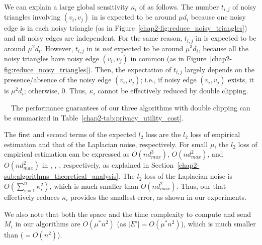 We can explain a large global sensitivity $\kappa_i$ of \AlgThree{} as follows. 
The number $t_{i,j}$ of noisy triangles involving $(v_i,v_j)$ in 
\AlgOne{} is expected to be around $\mu d_i$ because one noisy edge is in each noisy triangle (as in Figure~\ref{chap2-fig:reduce_noisy_triangles}) and all noisy edges are independent. 
For the same reason, $t_{i,j}$ in \AlgTwo{} is expected to be around $\mu^2 d_i$.  
% 
However, 
$t_{i,j}$ in \AlgThree{} is \textit{not} expected to be around $\mu^3 d_i$, because all the noisy triangles have noisy edge $(v_i,v_j)$ in common (as in Figure~\ref{chap2-fig:reduce_noisy_triangles}). 
Then, 
the expectation of $t_{i,j}$ 
largely depends on the presence/absence of the noisy edge $(v_i,v_j)$; i.e., if noisy edge $(v_i,v_j)$ exists, 
it is $\mu^2 d_i$; otherwise, $0$. 
Thus, 
$\kappa_i$ 
cannot be effectively reduced by double clipping. 

\smallskip
{}~~The 
performance guarantees 
of our three algorithms with double clipping can be summarized in Table~\ref{chap2-tab:privacy_utility_cost}.

The first and second terms of the expected 
$l_2$ loss are the $l_2$ loss of empirical estimation and that of the Laplacian noise, respectively. 
For small 
$\mu$, 
the $l_2$ loss of empirical estimation can be expressed as $O(n d_{max}^3)$, $O(n d_{max}^2)$, and $O(n d_{max}^2)$ in \AlgOne{}, \AlgTwo{}, \AlgThree{}, respectively, as explained in Section~\ref{chap2-sub:algorithms_theoretical_analysis}. 
The $l_2$ loss of the Laplacian noise is 
$O(\sum_{i=1}^n \kappa_i^2)$, 
which is much smaller than $O(n d_{max}^2)$. 
Thus, our \AlgTwo{} that effectively reduces $\kappa_i$ provides the smallest error, 
as shown in our experiments.

We also note that 
both the space and the time complexity to compute and send $M_i$ in our algorithms 
are $O(\mu^* n^2)$ (as $|E'| =  O(\mu^* n^2)$), which is much smaller than \cite{Imola_USENIX21} ($=O(n^2)$). 

